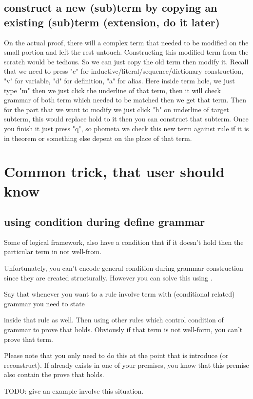 \documentclass[11pt, a4paper]{article}
\begin{document}
\subsection{construct a new (sub)term by copying an existing (sub)term (extension, do it later)}
On the actual proof, there will a complex term that needed to be modified on the small portion and left the rest untouch. Constructing this modified term from the scratch would be tedious. So we can just copy the old term then modify it. Recall that we need to press "c" for inductive/literal/sequence/dictionary construction, "v" for variable, "d" for definition, "a" for alias. Here inside term hole, we just type "m" then we just click the underline of that term, then it will check grammar of both term which needed to be matched then we get that term. Then for the part that we want to modify we just click "h" on underline of target subterm, this would replace hold to it then you can construct that subterm. Once you finish it just press "q", so phometa we check this new term against rule if it is in theorem or something else depent on the place of that term. 

\section{Common trick, that user should know}

\subsection{using condition during define grammar}

Some of logical framework, also have a condition that if it doesn't hold then the particular term in not well-from.

Unfortunately, you can't encode general condition during grammar construction since they are created structurally. However you can solve this using \kRule.

Say that whenever you want to a rule involve term  with (conditional related) grammar  you need to state

\kPremise {} 

inside that rule as well. Then using other rules which control condition of grammar  to prove that  holds. Obviously if that term is not well-form, you can't prove that term.

Please note that you only need to do this at the point that  is introduce (or reconstruct). If  already exists in one of your premises, you know that this premise also contain the prove that  holds.

TODO: give an example involve this situation.
\end{document}
